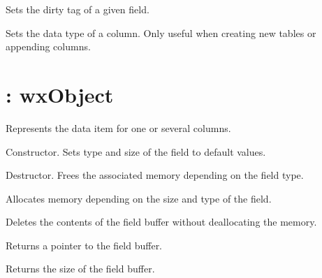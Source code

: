 
Sets the dirty tag of a given field.


  
Sets the data type of a column. Only useful when creating new tables or
appending columns.

\section{: wxObject}\label{wxqueryfield}


Represents the data item for one or several columns.



Constructor. Sets type and size of the field to default values.
  


Destructor. Frees the associated memory depending on the field type.



Allocates memory depending on the size and type of the field.



Deletes the contents of the field buffer without deallocating the memory.



Returns a pointer to the field buffer.



Returns the size of the field buffer.




